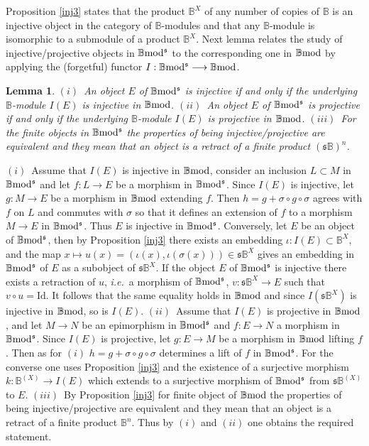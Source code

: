 \documentclass[12pt]{article}
\newtheorem{lem}[thm]{Lemma}
\def\id{{\rm id}}
\def\B{{\mathbb B}}
\newcommand{\ie}{{\it i.e.\/}\ }
\def\id{{\mbox{Id}}}
\def\yb{\mathfrak{s}}
\def\bmod{{\rm \B mod}}
\def\b2{{\rm \B mod^{\mathfrak s}}}
\begin{document}
Proposition \ref{inj3} states that the product $\B^X$ of any number of copies of $\B$ is an injective object in the category of $\B$-modules and that any $\B$-module  is isomorphic to a submodule of a product $\B^X$. Next lemma relates the study of injective/projective objects in $\b2$ to the corresponding one in $\bmod$ by applying the (forgetful) functor $I: \b2\longrightarrow \bmod$.	
\begin{lem}\label{injective b2}
	$(i)$~An object $E$ of $\b2$ is injective if and only if the underlying $\B$-module $I(E)$ is injective in $\bmod$.\newline
	$(ii)$~An object $E$ of $\b2$ is projective if and only if the underlying $\B$-module $I(E)$ is projective in $\bmod$.\newline
	$(iii)$~For the {\em finite} objects in $\b2$ the properties of being injective/projective are equivalent and they mean that an object is a retract of a finite product $(\yb\B)^n$. 
\end{lem}
\proof $(i)$~Assume that $I(E)$ is injective in $\bmod$, consider an inclusion $L\subset M$ in $\b2$ and let $f:L\to E$ be a morphism in $\b2$. Since $I(E)$ is injective, let $g:M\to E$ be a morphism in $\bmod$ extending $f$. Then $h=g+\sigma\circ g\circ \sigma$ agrees with $f$ on $L$ and commutes with $\sigma$ so that it defines an extension of $f$ to a morphism $M\to E$ in $\b2$. Thus $E$ is injective in $\b2$. Conversely, let 
$E$ be an object  of $\b2$, then by Proposition \ref{inj3} there exists an embedding $\iota:I(E)\subset \B^X$, and the map $x\mapsto u(x)=(\iota(x),\iota(\sigma(x)))\in \yb\B^X$ gives an embedding in $\b2$ of $E$ as a subobject of $\yb\B^X$. If the object $E$ of $\b2$ is injective there exists a retraction of $u$, \ie a morphism  of $\b2$, $v:\yb\B^X\to E$ such that $v\circ u=\id$. It follows that the same equality holds in $\bmod$ and since $I(\yb\B^X)$ is injective in $\bmod$, so is $I(E)$.\newline
	$(ii)$~Assume that $I(E)$ is projective in $\bmod$, and let $M\to N$ be an epimorphism in $\b2$ and $f:E\to N$ a morphism in $\b2$. Since $I(E)$ is projective, let $g:E\to M$ be a morphism in $\bmod$ lifting $f$. Then as for $(i)$ $h=g+\sigma\circ g\circ \sigma$ determines a lift of $f$ in $\b2$. For the converse one uses Proposition \ref{inj3} and the existence of a surjective morphism $k:\B^{(X)}\to I(E)$ which extends to a surjective morphism of $\b2$ from $\yb\B^{(X)}$ to $E$. \newline
	$(iii)$~By Proposition \ref{inj3} for finite object of $\bmod$ the properties of being injective/projective are equivalent and they mean that an object is a retract of a finite product $\B^n$. Thus by 	
	$(i)$ and $(ii)$ one obtains the required statement. \endproof 
\end{document}
